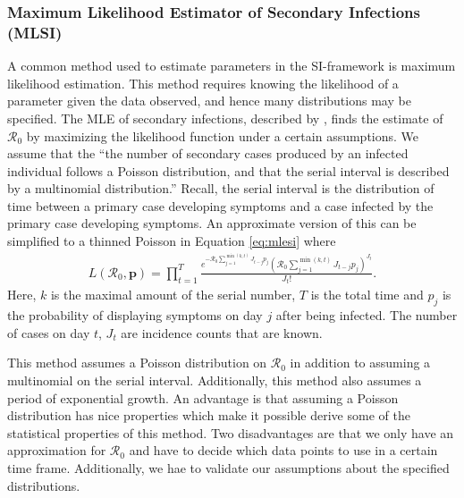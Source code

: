 \documentclass[12pt]{article}
\newcommand{\rr}{\ensuremath{\mathcal{R}_0}}
\begin{document}
\subsubsection{Maximum Likelihood Estimator of Secondary Infections (MLSI)}\label{sec:mle-si}
A common method used to estimate parameters in the SI-framework is maximum likelihood estimation.  This method requires knowing the likelihood of a parameter given the data observed, and hence many distributions may be specified.  The MLE of secondary infections, described by \cite{forsberg2008}, finds the estimate of $\rr$ by maximizing the likelihood function under a certain assumptions.  We assume that the ``the number of secondary cases produced by an infected individual follows a Poisson distribution, and that the serial interval is described by a multinomial distribution.''  Recall, the serial interval is the distribution of time between a primary case developing symptoms and a case infected by the primary case developing symptoms.  An approximate version of this can be simplified to a thinned Poisson in Equation \ref{eq:mlesi} where
\begin{align}\label{eq:mlesi}
  L(\rr, \mathbf{p}) = \prod_{t=1}^T \frac{e^{- \rr \sum_{j=1}^{\min(k,t)}J_{t-j}p_j}\left (\rr \sum_{j=1}^{\min(k,t)}J_{t-j}p_j \right )^{J_t}}{J_t!}.
\end{align}
Here, $k$ is the maximal amount of the serial number, $T$ is the total time and $p_j$ is the probability of displaying symptoms on day $j$ after being infected.  The number of cases on day $t$, $J_t$ are incidence counts that are known. 

This method assumes a Poisson distribution on $\rr$ in addition to assuming a multinomial on the serial interval.  Additionally, this method also assumes a period of exponential growth.  An advantage is that assuming a Poisson distribution has nice properties which make it possible derive some of the statistical properties of this method.  Two disadvantages are that we only have an approximation for $\rr$ and have to decide which data points to use in a certain time frame.  Additionally, we hae to validate our assumptions about the specified distributions.


\end{document}
